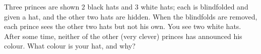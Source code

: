 Three princes are shown $2$ black hats and $3$ white hats; each is blindfolded and given a hat, and the other two hats are hidden. When the blindfolds are removed, each prince sees the other two hats but not his own. You see two white hats. After some time, neither of the other (very clever) princes has announced his colour. What colour is your hat, and why?
